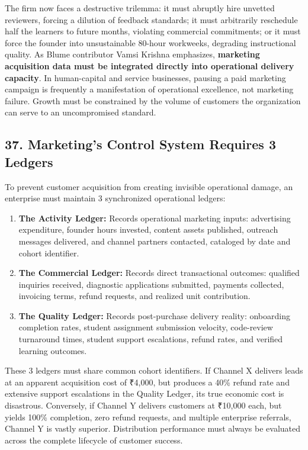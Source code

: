 The firm now faces a destructive trilemma: it must abruptly hire unvetted reviewers, forcing a dilution of feedback standards; it must arbitrarily reschedule half the learners to future months, violating commercial commitments; or it must force the founder into unsustainable 80-hour workweeks, degrading instructional quality. As Blume contributor Vamsi Krishna emphasizes, \textbf{marketing acquisition data must be integrated directly into operational delivery capacity}. In human-capital and service businesses, pausing a paid marketing campaign is frequently a manifestation of operational excellence, not marketing failure. Growth must be constrained by the volume of customers the organization can serve to an uncompromised standard.

\subsection*{37. Marketing's Control System Requires 3 Ledgers}

To prevent customer acquisition from creating invisible operational damage, an enterprise must maintain 3 synchronized operational ledgers:
\begin{enumerate}[leftmargin=*,itemsep=1pt]
  \item \textbf{The Activity Ledger:} Records operational marketing inputs: advertising expenditure, founder hours invested, content assets published, outreach messages delivered, and channel partners contacted, cataloged by date and cohort identifier.
  \item \textbf{The Commercial Ledger:} Records direct transactional outcomes: qualified inquiries received, diagnostic applications submitted, payments collected, invoicing terms, refund requests, and realized unit contribution.
  \item \textbf{The Quality Ledger:} Records post-purchase delivery reality: onboarding completion rates, student assignment submission velocity, code-review turnaround times, student support escalations, refund rates, and verified learning outcomes.
\end{enumerate}

These 3 ledgers must share common cohort identifiers. If Channel X delivers leads at an apparent acquisition cost of ₹4,000, but produces a 40\% refund rate and extensive support escalations in the Quality Ledger, its true economic cost is disastrous. Conversely, if Channel Y delivers customers at ₹10,000 each, but yields 100\% completion, zero refund requests, and multiple enterprise referrals, Channel Y is vastly superior. Distribution performance must always be evaluated across the complete lifecycle of customer success.
